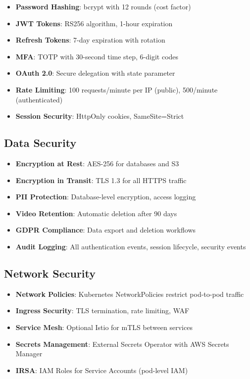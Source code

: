 \documentclass[11pt,letterpaper]{article}
\begin{document}
\begin{itemize}[noitemsep]
    \item \textbf{Password Hashing}: bcrypt with 12 rounds (cost factor)
    \item \textbf{JWT Tokens}: RS256 algorithm, 1-hour expiration
    \item \textbf{Refresh Tokens}: 7-day expiration with rotation
    \item \textbf{MFA}: TOTP with 30-second time step, 6-digit codes
    \item \textbf{OAuth 2.0}: Secure delegation with state parameter
    \item \textbf{Rate Limiting}: 100 requests/minute per IP (public), 500/minute (authenticated)
    \item \textbf{Session Security}: HttpOnly cookies, SameSite=Strict
\end{itemize}

\subsection{Data Security}

\begin{itemize}[noitemsep]
    \item \textbf{Encryption at Rest}: AES-256 for databases and S3
    \item \textbf{Encryption in Transit}: TLS 1.3 for all HTTPS traffic
    \item \textbf{PII Protection}: Database-level encryption, access logging
    \item \textbf{Video Retention}: Automatic deletion after 90 days
    \item \textbf{GDPR Compliance}: Data export and deletion workflows
    \item \textbf{Audit Logging}: All authentication events, session lifecycle, security events
\end{itemize}

\subsection{Network Security}

\begin{itemize}[noitemsep]
    \item \textbf{Network Policies}: Kubernetes NetworkPolicies restrict pod-to-pod traffic
    \item \textbf{Ingress Security}: TLS termination, rate limiting, WAF
    \item \textbf{Service Mesh}: Optional Istio for mTLS between services
    \item \textbf{Secrets Management}: External Secrets Operator with AWS Secrets Manager
    \item \textbf{IRSA}: IAM Roles for Service Accounts (pod-level IAM)
\end{itemize}
\end{document}
